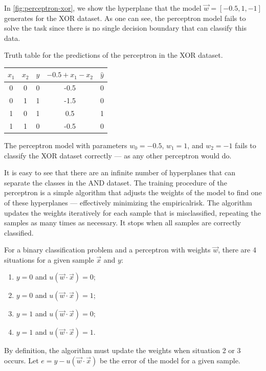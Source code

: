 In \cref{fig:perceptron-xor}, we show the hyperplane that the model $\vec{w} = [-0.5, 1, -1]$
generates for the XOR dataset.  As one can see, the perceptron model fails to solve the
task since there is no single decision boundary that can classify this data.

\begin{tablebox}[label=tab:xor-perceptron]{Truth table for the predictions of the perceptron in the XOR dataset.}
  \centering
  \begin{tabular}{ccc|cc}
    \toprule
    $x_1$ & $x_2$ & $y$ & $-0.5 + x_1 - x_2$ & $\hat{y}$ \\
    \midrule
    0 & 0 & 0 & -0.5 & 0 \\
    0 & 1 & 1 & -1.5 & 0 \\
    1 & 0 & 1 & 0.5 & 1 \\
    1 & 1 & 0 & -0.5 & 0 \\
    \bottomrule
  \end{tabular}
  \tcblower
  The perceptron model with parameters $w_0 = -0.5$, $w_1 = 1$, and $w_2 = -1$
  fails to classify the XOR dataset correctly --- as any other perceptron would do.
\end{tablebox}

It is easy to see that there are an infinite number of hyperplanes that can separate the
classes in the AND dataset.  The training procedure of the perceptron is a simple
algorithm that adjusts the weights of the model to find one of these hyperplanes ---
effectively minimizing the \gls{empiricalrisk}.  The algorithm updates the weights iteratively
for each sample that is misclassified, repeating the samples as many times as necessary.
It stops when all samples are correctly classified.

For a binary classification problem and a perceptron with weights $\vec{w}$, there are 4
situations for a given sample $\vec{x}$ and $y$:
\begin{enumerate}
  \itemsep0em
  \item $y = 0$ and $u(\vec{w} \cdot \vec{x})= 0$;
  \item $y = 0$ and $u(\vec{w} \cdot \vec{x})= 1$;
  \item $y = 1$ and $u(\vec{w} \cdot \vec{x})= 0$;
  \item $y = 1$ and $u(\vec{w} \cdot \vec{x})= 1$.
\end{enumerate}

By definition, the algorithm must update the weights when situation 2 or 3 occurs.
Let $e = y - u(\vec{w} \cdot \vec{x})$ be the error of the model for a given sample.


